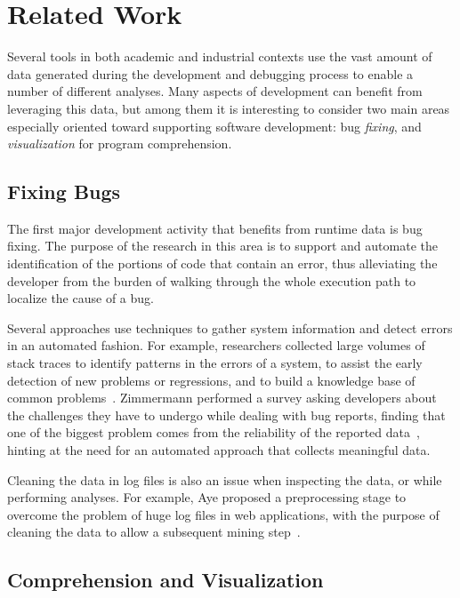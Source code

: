 \section{Related Work} \label{sec:related}

Several tools in both academic and industrial contexts use the vast amount of data generated during the development and debugging process to enable a number of different analyses.
Many aspects of development can benefit from leveraging this data, but among them it is interesting to consider two main areas especially oriented toward supporting software development: bug \emph{fixing}, and \emph{visualization} for program comprehension.

\subsection{Fixing Bugs}

The first major development activity that benefits from runtime data is bug fixing. The purpose of the research in this area is to support and automate the identification of the portions of code that contain an error, thus alleviating the developer from the burden of walking through the whole execution path to localize the cause of a bug.

Several approaches use techniques to gather system information and detect errors in an automated fashion. For example, researchers collected large volumes of stack traces to identify patterns in the errors of a system, to assist the early detection of new problems or regressions, and to build a knowledge base of common problems~\cite{Han2012,Arno2007,DalS2015b}.
Zimmermann \etal performed a survey asking developers about the challenges they have to undergo while dealing with bug reports, finding that one of the biggest problem comes from the reliability of the reported data~\cite{Zimm2010a}, hinting at the need for an automated approach that collects meaningful data.

Cleaning the data in log files is also an issue when inspecting the data, or while performing analyses. For example, Aye proposed a preprocessing stage to overcome the problem of huge log files in web applications, with the purpose of cleaning the data to allow a subsequent mining step~\cite{Aye2011}.

\subsection{Comprehension and Visualization}

